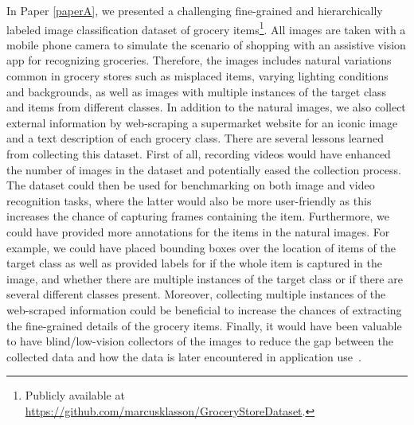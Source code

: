 In Paper \ref{paperA}, we presented a challenging fine-grained and hierarchically labeled image classification dataset of grocery items\footnote{Publicly available at \url{https://github.com/marcusklasson/GroceryStoreDataset}.}. All images are taken with a mobile phone camera to simulate the scenario of shopping with an assistive vision app for recognizing groceries. Therefore, the images includes natural variations common in grocery stores such as misplaced items, varying lighting conditions and backgrounds, as well as images with multiple instances of the target class and items from different classes. In addition to the natural images, we also collect external information by web-scraping a supermarket website for an iconic image and a text description of each grocery class. There are several lessons learned from collecting this dataset. First of all, recording videos would have enhanced the number of images in the dataset and potentially eased the collection process. The dataset could then be used for benchmarking on both image and video recognition tasks, where the latter would also be more user-friendly as this increases the chance of capturing frames containing the item. Furthermore, we could have provided more annotations for the items in the natural images. For example, we could have placed bounding boxes over the location of items of the target class as well as provided labels for if the whole item is captured in the image, and whether there are multiple instances of the target class or if there are several different classes present. Moreover, collecting multiple instances of the web-scraped information could be beneficial to increase the chances of extracting the fine-grained details of the grocery items. Finally, it would have been valuable to have blind/low-vision collectors of the images to reduce the gap between the collected data and how the data is later encountered in application use~\cite{theodorou2021disability}. 

